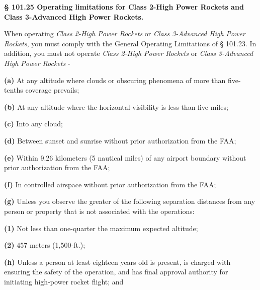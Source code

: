 \textbf{§ 101.25 Operating limitations for Class 2-High Power Rockets and Class 3-Advanced High Power Rockets.}\par

When operating \textit{Class 2-High Power Rockets} or \textit{Class 3-Advanced High Power Rockets}, you must comply with the General Operating Limitations of § 101.23. In addition, you must not operate \textit{Class 2-High Power Rockets} or \textit{Class 3-Advanced High Power Rockets} -\par

\textbf{(a)} At any altitude where clouds or obscuring phenomena of more than five-tenths coverage prevails;\par

\textbf{(b)} At any altitude where the horizontal visibility is less than five miles;\par

\textbf{(c)} Into any cloud;\par

\textbf{(d)} Between sunset and sunrise without prior authorization from the FAA;\par

\textbf{(e)} Within 9.26 kilometers (5 nautical miles) of any airport boundary without prior authorization from the FAA;\par

\textbf{(f)} In controlled airspace without prior authorization from the FAA;\par

\textbf{(g)} Unless you observe the greater of the following separation distances from any person or property that is not associated with the operations:\par

\begin{adjustwidth}{0.5in}{0.0in}
\textbf{(1)} Not less than one-quarter the maximum expected altitude;\par

\end{adjustwidth}

\begin{adjustwidth}{0.5in}{0.0in}
\textbf{(2)} 457 meters (1,500-ft.);\par

\end{adjustwidth}

\textbf{(h)} Unless a person at least eighteen years old is present, is charged with ensuring the safety of the operation, and has final approval authority for initiating high-power rocket flight; and\par

